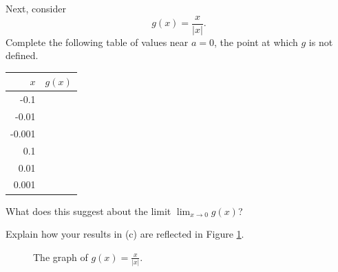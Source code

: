 \begin{pa}
      
\item Next, consider $$g(x) = \frac{x}{|x|}.$$
Complete the following table of values near $a = 0$, the point at which $g$ is not defined.
  \begin{center}
    \begin{tabular}{|r|c|}
      \hline      
      $x$ & $g(x)$ \\
      \hline
      \hline
      -0.1 & \hspace*{1in} \\
      \hline
      -0.01 & \hspace*{1in} \\
      \hline
      -0.001 & \hspace*{1in} \\
      \hline
      0.1 & \hspace*{1in} \\
      \hline
      0.01 & \hspace*{1in} \\
      \hline
      0.001 & \hspace*{1in} \\
      \hline
    \end{tabular}
  \end{center}
  What does this suggest about the limit $\lim_{x\to 0}g(x)$?

\item Explain how your results in (c) are reflected in Figure
  \ref{F:10.1.activity.2}. 

  \begin{figure}[ht]
    \begin{center}
      \caption{The graph of $g(x) = \frac{x}{|x|}$.}
      \label{F:10.1.activity.2}
    \end{center}
  \end{figure}
      

\end{pa}
